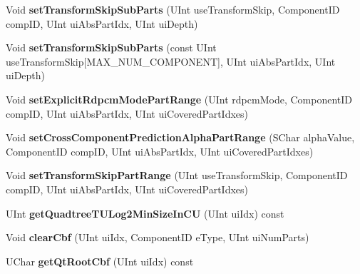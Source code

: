 \begin{DoxyCompactItemize}
\item 
\mbox{\label{class_t_com_data_c_u_a2965453a59260dd633f65530f5a60395}} 
Void {\bfseries set\+Transform\+Skip\+Sub\+Parts} (U\+Int use\+Transform\+Skip, Component\+ID comp\+ID, U\+Int ui\+Abs\+Part\+Idx, U\+Int ui\+Depth)
\item 
\mbox{\label{class_t_com_data_c_u_abf609cf38875bd7740325edb60750817}} 
Void {\bfseries set\+Transform\+Skip\+Sub\+Parts} (const U\+Int use\+Transform\+Skip\mbox{[}M\+A\+X\+\_\+\+N\+U\+M\+\_\+\+C\+O\+M\+P\+O\+N\+E\+NT\mbox{]}, U\+Int ui\+Abs\+Part\+Idx, U\+Int ui\+Depth)
\item 
\mbox{\label{class_t_com_data_c_u_a7c434919716dc41c1f40890207f0c6cb}} 
Void {\bfseries set\+Explicit\+Rdpcm\+Mode\+Part\+Range} (U\+Int rdpcm\+Mode, Component\+ID comp\+ID, U\+Int ui\+Abs\+Part\+Idx, U\+Int ui\+Covered\+Part\+Idxes)
\item 
\mbox{\label{class_t_com_data_c_u_a9c1462193898394708ccaad81f7f57ca}} 
Void {\bfseries set\+Cross\+Component\+Prediction\+Alpha\+Part\+Range} (S\+Char alpha\+Value, Component\+ID comp\+ID, U\+Int ui\+Abs\+Part\+Idx, U\+Int ui\+Covered\+Part\+Idxes)
\item 
\mbox{\label{class_t_com_data_c_u_a3ba982c83f64e854d1d27a1ede4f4be0}} 
Void {\bfseries set\+Transform\+Skip\+Part\+Range} (U\+Int use\+Transform\+Skip, Component\+ID comp\+ID, U\+Int ui\+Abs\+Part\+Idx, U\+Int ui\+Covered\+Part\+Idxes)
\item 
\mbox{\label{class_t_com_data_c_u_a309ac36b1186aa570c9186f9a6b3d086}} 
U\+Int {\bfseries get\+Quadtree\+T\+U\+Log2\+Min\+Size\+In\+CU} (U\+Int ui\+Idx) const
\item 
\mbox{\label{class_t_com_data_c_u_aac124cfc45c3f1530fae8496877ffaed}} 
Void {\bfseries clear\+Cbf} (U\+Int ui\+Idx, Component\+ID e\+Type, U\+Int ui\+Num\+Parts)
\item 
\mbox{\label{class_t_com_data_c_u_aa0ccdd19e5f80cd5b618a971d24382c5}} 
U\+Char {\bfseries get\+Qt\+Root\+Cbf} (U\+Int ui\+Idx) const
\item 

\end{DoxyCompactItemize}
